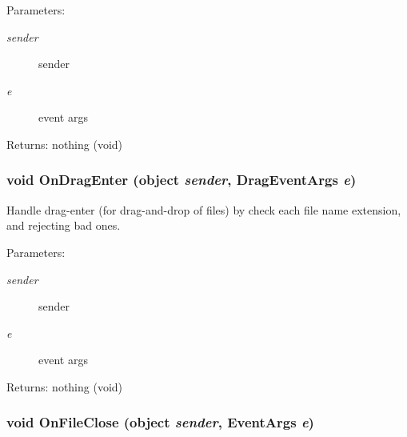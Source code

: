 \begin{Desc}
\item[Parameters:]
\begin{description}
\item[{\em sender}]sender \item[{\em e}]event args \end{description}
\end{Desc}
\begin{Desc}
\item[Returns:]nothing (void) \end{Desc}
\subsubsection{\setlength{\rightskip}{0pt plus 5cm}void On\-Drag\-Enter (object {\em sender}, Drag\-Event\-Args {\em e})\hspace{0.3cm}{\tt  [private]}}\label{class_c_s_image_viewer_1_1_c_s_image_viewer_bbe1f3021f3a126f24f0ccee91e7d710}


Handle drag-enter (for drag-and-drop of files) by check each file name extension, and rejecting bad ones. 

\begin{Desc}
\item[Parameters:]
\begin{description}
\item[{\em sender}]sender \item[{\em e}]event args \end{description}
\end{Desc}
\begin{Desc}
\item[Returns:]nothing (void) \end{Desc}
\subsubsection{\setlength{\rightskip}{0pt plus 5cm}void On\-File\-Close (object {\em sender}, Event\-Args {\em e})\hspace{0.3cm}{\tt  [private]}}\label{class_c_s_image_viewer_1_1_c_s_image_viewer_15a46e4fe445ba9f7918053b30ee7b1e}


